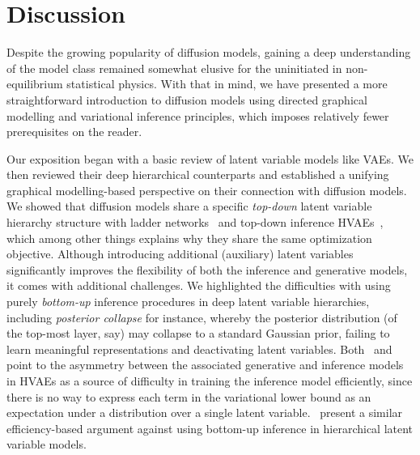 \newpage
\section{Discussion}
%
Despite the growing popularity of diffusion models, gaining a deep understanding of the model class remained somewhat elusive for the uninitiated in non-equilibrium statistical physics. With that in mind, we have presented a more straightforward introduction to diffusion models using directed graphical modelling and variational inference principles, which imposes relatively fewer prerequisites on the reader.

Our exposition began with a basic review of latent variable models like VAEs. We then reviewed their deep hierarchical counterparts and established a unifying graphical modelling-based perspective on their connection with diffusion models. We showed that diffusion models share a specific \textit{top-down} latent variable hierarchy structure with ladder networks~\citep{valpola2015neural} and top-down inference HVAEs~\citep{sonderby2016ladder}, which among other things explains why they share the same optimization objective.
Although introducing additional (auxiliary) latent variables significantly improves the flexibility of both the inference and generative models, it comes with additional challenges. We highlighted the difficulties with using purely \textit{bottom-up} inference procedures in deep latent variable hierarchies, including \textit{posterior collapse} for instance, whereby the posterior distribution (of the top-most layer, say) may collapse to a standard Gaussian prior, failing to learn meaningful representations and deactivating latent variables. Both~\cite{burda2015importance} and~\cite{sohl2015deep} point to the asymmetry between the associated generative and inference models in HVAEs as a source of difficulty in training the inference model efficiently, since there is no way to express each term in the variational lower bound as an expectation under a distribution over a single latent variable.~\cite{luo2022understanding,bishop2023} present a similar efficiency-based argument against using bottom-up inference in hierarchical latent variable models. 

